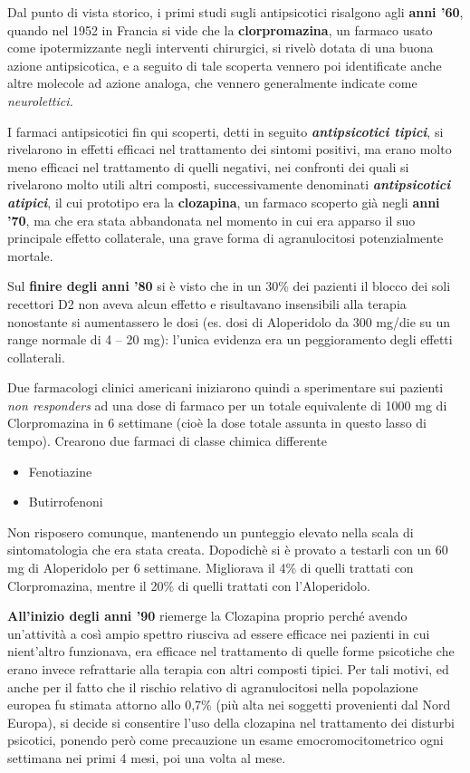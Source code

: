 Dal punto di vista storico, i primi studi sugli antipsicotici risalgono
agli \textbf{anni '60}, quando nel 1952 in Francia si vide che la
\textbf{clorpromazina}, un farmaco usato come ipotermizzante negli
interventi chirurgici, si rivelò dotata di una buona azione
antipsicotica, e a seguito di tale scoperta vennero poi identificate
anche altre molecole ad azione analoga, che vennero generalmente
indicate come \emph{neurolettici.}

I farmaci antipsicotici fin qui scoperti, detti in seguito
\textbf{\emph{antipsicotici tipici}}, si rivelarono in effetti efficaci
nel trattamento dei sintomi positivi, ma erano molto meno efficaci nel
trattamento di quelli negativi, nei confronti dei quali si rivelarono
molto utili altri composti, successivamente denominati
\textbf{\emph{antipsicotici atipici}}, il cui prototipo era la
\textbf{clozapina}, un farmaco scoperto già negli \textbf{anni '70}, ma
che era stata abbandonata nel momento in cui era apparso il suo
principale effetto collaterale, una grave forma di agranulocitosi
potenzialmente mortale.

Sul \textbf{finire degli anni '80} si è visto che in un 30\% dei
pazienti il blocco dei soli recettori D2 non aveva alcun effetto e
risultavano insensibili alla terapia nonostante si aumentassero le dosi
(es. dosi di Aloperidolo da 300 mg/die su un range normale di 4 -- 20
mg): l'unica evidenza era un peggioramento degli effetti collaterali.

Due farmacologi clinici americani iniziarono quindi a sperimentare sui
pazienti \emph{non responders} ad una dose di farmaco per un totale
equivalente di 1000 mg di Clorpromazina in 6 settimane (cioè la dose
totale assunta in questo lasso di tempo). Crearono due farmaci di classe
chimica differente

\begin{itemize}
\item
  Fenotiazine
\item
  Butirrofenoni
\end{itemize}

Non risposero comunque, mantenendo un punteggio elevato nella scala di
sintomatologia che era stata creata. Dopodichè si è provato a testarli
con un 60 mg di Aloperidolo per 6 settimane. Migliorava il 4\% di quelli
trattati con Clorpromazina, mentre il 20\% di quelli trattati con
l'Aloperidolo.

\textbf{All'inizio degli anni '90} riemerge la Clozapina proprio perché
avendo un'attività a così ampio spettro riusciva ad essere efficace nei
pazienti in cui nient'altro funzionava, era efficace nel trattamento di
quelle forme psicotiche che erano invece refrattarie alla terapia con
altri composti tipici. Per tali motivi, ed anche per il fatto che il
rischio relativo di agranulocitosi nella popolazione europea fu stimata
attorno allo 0,7\% (più alta nei soggetti provenienti dal Nord Europa),
si decide si consentire l'uso della clozapina nel trattamento dei
disturbi psicotici, ponendo però come precauzione un esame
emocromocitometrico ogni settimana nei primi 4 mesi, poi una volta al
mese.

